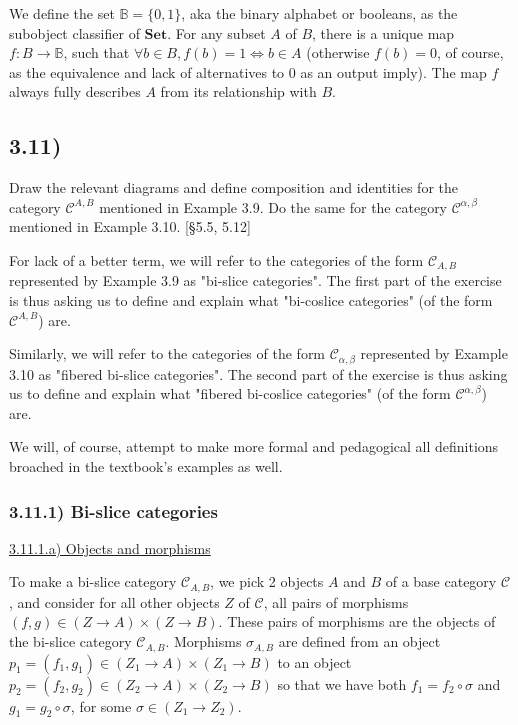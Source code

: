 \documentclass[12pt, letterpaper, twoside]{report}
\begin{document}
We define the set $\mathbb{B} = \{ 0, 1 \}$, aka the binary alphabet or booleans, as the subobject classifier of $\mathbf{Set}$. For any subset $A$ of $B$, there is a unique map $f: B \to \mathbb{B}$, such that $\forall b \in B, f(b) = 1 \Leftrightarrow b \in A$ (otherwise $f(b) = 0$, of course, as the equivalence and lack of alternatives to $0$ as an output imply). The map $f$ always fully describes $A$ from its relationship with $B$.



\subsection*{3.11)}

Draw the relevant diagrams and define composition and identities for the category $\mathcal{C}^{A,B}$ mentioned in Example 3.9. Do the same for the category $\mathcal{C}^{\alpha, \beta}$ mentioned in Example 3.10. [§5.5, 5.12]

For lack of a better term, we will refer to the categories of the form $\mathcal{C}_{A,B}$ represented by Example 3.9 as "bi-slice categories". The first part of the exercise is thus asking us to define and explain what "bi-coslice categories" (of the form $\mathcal{C}^{A,B}$) are.

Similarly, we will refer to the categories of the form $\mathcal{C}_{\alpha, \beta}$ represented by Example 3.10 as "fibered bi-slice categories". The second part of the exercise is thus asking us to define and explain what "fibered bi-coslice categories" (of the form $\mathcal{C}^{\alpha, \beta}$) are.

We will, of course, attempt to make more formal and pedagogical all definitions broached in the textbook's examples as well.


\subsubsection*{3.11.1) Bi-slice categories}

\vspace{5mm}
\underline{3.11.1.a) Objects and morphisms}

To make a bi-slice category $\mathcal{C}_{A,B}$, we pick 2 objects $A$ and $B$ of a base category $\mathcal{C}$, and consider for all other objects $Z$ of $\mathcal{C}$, all pairs of morphisms $(f, g) \in (Z \to A) \times (Z \to B)$. These pairs of morphisms are the objects of the bi-slice category $\mathcal{C}_{A,B}$. Morphisms $\sigma_{A,B}$ are defined from an object $p_1 = (f_1, g_1) \in (Z_1 \to A) \times (Z_1 \to B)$ to an object $p_2 = (f_2, g_2) \in (Z_2 \to A) \times (Z_2 \to B)$ so that we have both $f_1 = f_2 \circ \sigma$ and $g_1 = g_2 \circ \sigma$, for some $\sigma \in (Z_1 \to Z_2)$.
\end{document}
